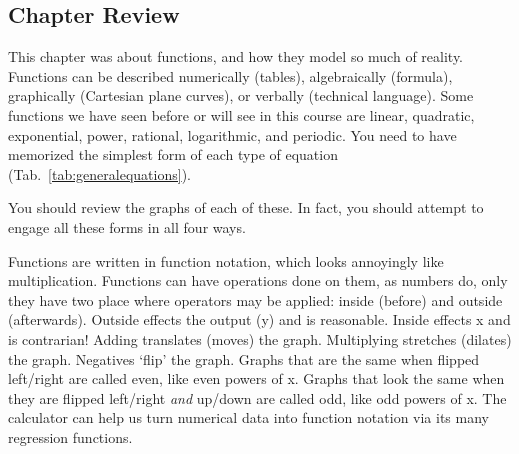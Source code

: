 \subsection{Chapter Review}
This chapter was about functions, and how they model so much of reality.  Functions can be
described numerically (tables), algebraically (formula), graphically (Cartesian plane curves), or
verbally (technical language).  Some functions we have seen before or will see in this course
are linear, quadratic, exponential, power, rational, logarithmic, and periodic.
You need to have memorized the simplest form of each type of equation (Tab.~\ref{tab:generalequations}).



You should review the graphs of each of these.  In fact, you should attempt to engage all
these forms in all four ways.

Functions are written in function notation, which looks annoyingly like multiplication.
Functions can have operations done on them, as numbers do, only they have two place where
operators may be applied: inside (before) and outside (afterwards).  Outside effects the output
(y) and is reasonable.  Inside effects x and is contrarian!  Adding translates (moves) the graph.
Multiplying stretches (dilates) the graph.  Negatives `flip' the graph.  Graphs that are the same when flipped
left/right are called even, like even powers of x.  Graphs that look the same when they are
flipped left/right \emph{and} up/down are called odd, like odd powers of x.  The calculator can help us turn
numerical data into function notation via its many regression functions.


